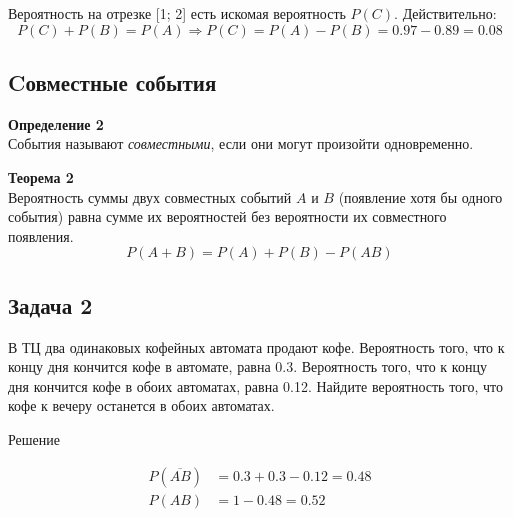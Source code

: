 \documentclass[a4paper,12pt]{article}
\begin{document}
Вероятность на отрезке [1; 2] есть искомая вероятность $P(C)$. Действительно:
$$P(C)+P(B)=P(A)\Rightarrow{}P(C)=P(A)-P(B)=0.97-0.89=0.08$$

\subsection{Cовместные события}

\textbf{Определение 2}\\
События называют \textit{совместными}, если они могут произойти одновременно.

\textbf{Теорема 2}\\
Вероятность суммы двух совместных событий $A$ и $B$ (появление хотя бы одного события) равна сумме их вероятностей без вероятности их совместного появления.
$$P(A+B)=P(A)+P(B)-P(AB)$$

\subsection*{Задача 2}
В ТЦ два одинаковых кофейных автомата продают кофе. Вероятность того, что к концу дня кончится кофе в автомате, равна 0.3.  Вероятность того, что к концу дня кончится кофе в обоих автоматах, равна 0.12. Найдите вероятность того, что кофе к вечеру останется в обоих автоматах.
\begin{center}
Решение
\end{center}
\begin{align*}
P(\overline{AB})&=0.3+0.3-0.12=0.48\\
P(AB) &= 1-0.48=0.52    
\end{align*}
\end{document}
